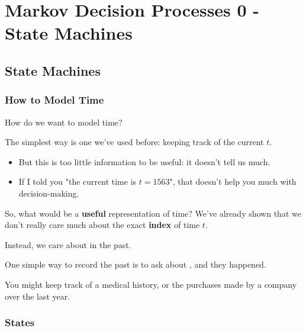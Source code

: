 \setcounter{chapter}{12-1} %

\chapter{Markov Decision Processes 0 - State Machines}

\setcounter{section}{0}

\section{State Machines}

    \subsection{How to Model Time}

        How do we want to model time?

        The simplest way is one we've used before: keeping track of the current  $t$.

        \begin{itemize}
            \item But this is too little information to be useful: it doesn't tell us much.
            \item \miniex If I told you "the current time is $t=1563$", that doesn't help you much with decision-making.
        \end{itemize}

        So, what would be a \textbf{useful} representation of time? We've already shown that we don't really care much about the exact \textbf{index} of time $t$.

        Instead, we care about  in the past.\\

        \begin{concept}
            One simple way to record the past is to ask about , and  they happened.
        \end{concept}

        \miniex You might keep track of a medical history, or the purchases made by a company over the last year.


    \phantom{}

    \subsection{States}

